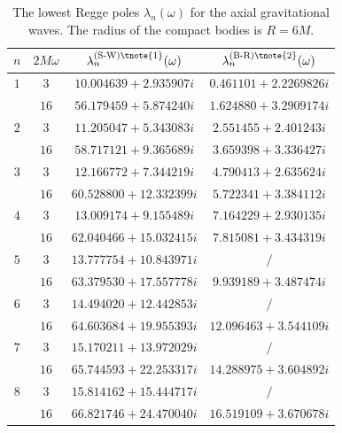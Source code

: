 \documentclass[aps,prd,longbibliography,reprint,twocolumn,amsmath,amssymb,amsfonts,showpacs,footnote,superscriptaddress]{revtex4-1}%
\begin{document}
\begingroup
\squeezetable
\begin{table}[htp]
\begin{threeparttable}[htp]
\caption{\label{tab:table3} The lowest Regge poles $\lambda_{n}(\omega)$ for the axial gravitational waves. The radius of the compact bodies is $R = 6M$.}
\smallskip
\centering
\begin{ruledtabular}
\begin{tabular}{cccc}
 $n$ & $2M\omega$  & $\lambda^{\text{(S-W)\tnote{1}}}_n(\omega)$ & $\lambda^{\text{(B-R)\tnote{2}}}_n(\omega)$
 \\ \hline
$1$  & $3$  & $10.004639+2.935907 i$  & $0.461101+2.2269826 i $   \\
     & $16$ & $56.179459+5.874240 i $ & $1.624880+3.2909174 i $
 \\

$2$  & $3$  & $11.205047+5.343083 i$  & $2.551455+2.401243 i $     \\
     & $16$ & $58.717121+9.365689 i  $& $3.659398+3.336427 i $
 \\

$3$  & $3$  & $12.166772+7.344219 i $  & $4.790413+2.635624 i  $     \\
     & $16$ & $60.528800+12.332399 i $ & $5.722341+3.384112 i $
 \\

$4$  & $3$  & $13.009174+9.155489 i  $  & $7.164229+2.930135 i $     \\
     & $16$ & $62.040466+15.032415 i  $ & $7.815081+3.434319 i  $
      \\

$5$  & $3$  & $13.777754+10.843971 i $  & $/ $   \\
     & $16$ & $63.379530+17.557778 i $  & $9.939189+3.487474 i $      \\

$6$  & $3$  & $14.494020+12.442853 i $  & $/ $      \\
     & $16$ & $64.603684+19.955393 i $  & $12.096463+3.544109 i  $
   \\

$7$  & $3$  & $15.170211+13.972029 i $  & $ /$       \\
     & $16$ & $65.744593+22.253317 i $  & $14.288975+3.604892 i $
         \\

$8$  & $3$  & $15.814162+15.444717 i $  & $/ $        \\
     & $16$ & $66.821746+24.470040 i $  & $16.519109+3.670678 i $
         \\


\end{tabular}
\end{ruledtabular}
\end{threeparttable}
\end{table}
\end{document}
